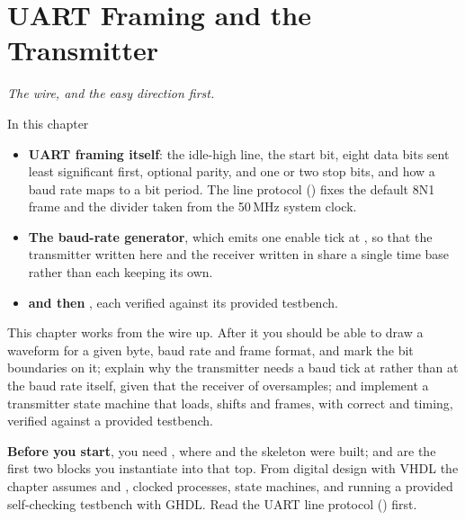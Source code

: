 
\chapter{UART Framing and the Transmitter}
\label{c2:ch}

{\large\itshape The wire, and the easy direction first.\par}

\begin{chapterbox}{In this chapter}
\begin{itemize}
  \item \textbf{UART framing itself}: the idle-high line, the start bit, eight data bits sent least
    significant first, optional parity, and one or two stop bits, and how a baud rate maps to a bit
    period. The line protocol () fixes the default 8N1 frame and the
     divider taken from the 50\,MHz system clock.
  \item \textbf{The baud-rate generator}, which emits one enable tick at , so that
    the transmitter written here and the receiver written in  share a single time base
    rather than each keeping its own.
  \item \textbf{ and then }, each verified against its provided
    testbench.
\end{itemize}
\end{chapterbox}

This chapter works from the wire up. After it you should be able to draw a  waveform for a
given byte, baud rate and frame format, and mark the bit boundaries on it; explain why the
transmitter needs a baud tick at  rather than at the baud rate itself, given that
the receiver of  oversamples; and implement a transmitter state machine that loads,
shifts and frames, with correct  and  timing, verified against a provided
testbench.

\textbf{Before you start}, you need , where  and the 
skeleton were built;  and  are the first two blocks you instantiate
into that top. From digital design with VHDL the chapter assumes  and
, clocked processes, state machines, and running a provided self-checking
testbench with GHDL. Read the UART line protocol () first.

